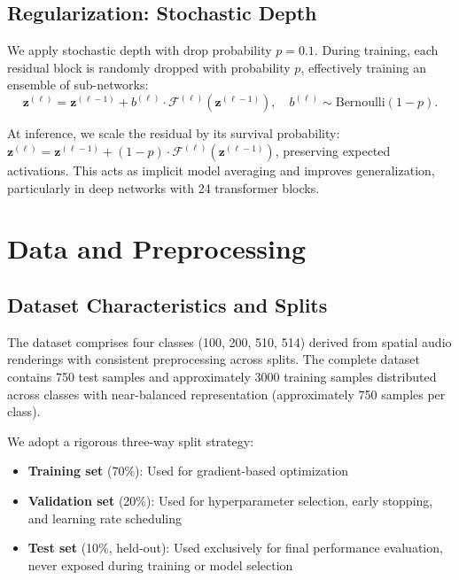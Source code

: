 \documentclass[11pt,a4paper]{article}
\begin{document}
\subsection{Regularization: Stochastic Depth}

We apply stochastic depth \cite{huang2016stochasticdepth} with drop probability \(p=0.1\). During training, each residual block is randomly dropped with probability \(p\), effectively training an ensemble of sub-networks:
\begin{equation}
\mathbf{z}^{(\ell)} = \mathbf{z}^{(\ell-1)} + b^{(\ell)} \cdot \mathcal{F}^{(\ell)}(\mathbf{z}^{(\ell-1)}), \quad b^{(\ell)} \sim \mathrm{Bernoulli}(1-p).
\end{equation}

At inference, we scale the residual by its survival probability: \(\mathbf{z}^{(\ell)} = \mathbf{z}^{(\ell-1)} + (1-p) \cdot \mathcal{F}^{(\ell)}(\mathbf{z}^{(\ell-1)})\), preserving expected activations. This acts as implicit model averaging and improves generalization, particularly in deep networks with 24 transformer blocks.

\section{Data and Preprocessing}

\subsection{Dataset Characteristics and Splits}
The dataset comprises four classes (100, 200, 510, 514) derived from spatial audio renderings with consistent preprocessing across splits. The complete dataset contains 750 test samples and approximately 3000 training samples distributed across classes with near-balanced representation (approximately 750 samples per class). 

We adopt a rigorous three-way split strategy:
\begin{itemize}[leftmargin=*]
\item \textbf{Training set} (70\%): Used for gradient-based optimization
\item \textbf{Validation set} (20\%): Used for hyperparameter selection, early stopping, and learning rate scheduling
\item \textbf{Test set} (10\%, held-out): Used exclusively for final performance evaluation, never exposed during training or model selection
\end{itemize}
\end{document}

